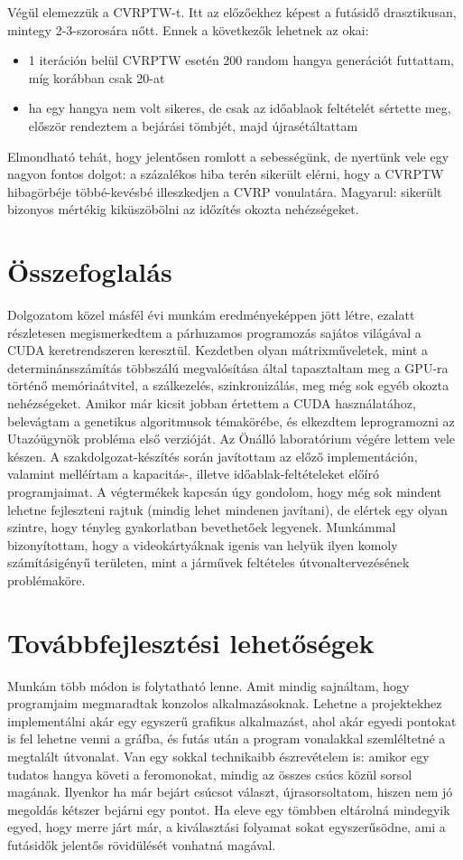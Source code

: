 Végül elemezzük a CVRPTW-t. Itt az előzőekhez képest a futásidő drasztikusan, mintegy 2-3-szorosára nőtt. Ennek a következők lehetnek az okai:
\begin{itemize}
	\item 1 iteráción belül CVRPTW esetén 200 random hangya generációt futtattam, míg korábban csak 20-at
	\item ha egy hangya nem volt sikeres, de csak az időablaok feltételét sértette meg, először rendeztem a bejárási tömbjét, majd újrasétáltattam
\end{itemize}
Elmondható tehát, hogy jelentősen romlott a sebességünk, de nyertünk vele egy nagyon fontos dolgot: a százalékos hiba terén sikerült elérni, hogy a CVRPTW hibagörbéje többé-kevésbé illeszkedjen a CVRP vonulatára. Magyarul: sikerült bizonyos mértékig kiküszöbölni az időzítés okozta nehézségeket.

\section{Összefoglalás}
Dolgozatom közel másfél évi munkám eredményeképpen jött létre, ezalatt részletesen megismerkedtem a párhuzamos programozás sajátos világával a CUDA keretrendszeren keresztül. Kezdetben olyan mátrixműveletek, mint a determinánsszámítás többszálú megvalósítása által tapasztaltam meg a GPU-ra történő memóriaátvitel, a szálkezelés, szinkronizálás, meg még sok egyéb okozta nehézségeket. Amikor már kicsit jobban értettem a CUDA használatához, belevágtam a genetikus algoritmusok témakörébe, és elkezdtem leprogramozni az Utazóügynök probléma első verzióját. Az Önálló laboratórium végére lettem vele készen. A szakdolgozat-készítés során javítottam az előző implementáción, valamint melléírtam a kapacitás-, illetve időablak-feltételeket előíró programjaimat. A végtermékek kapcsán úgy gondolom, hogy még sok mindent lehetne fejleszteni rajtuk (mindig lehet mindenen javítani), de elértek egy olyan szintre, hogy tényleg gyakorlatban bevethetőek legyenek. Munkámmal bizonyítottam, hogy a videokártyáknak igenis van helyük ilyen komoly számításigényű területen, mint a járművek feltételes útvonaltervezésének problémaköre.

\section{Továbbfejlesztési lehetőségek}

Munkám több módon is folytatható lenne. Amit mindig sajnáltam, hogy programjaim megmaradtak konzolos alkalmazásoknak. Lehetne a projektekhez implementálni akár egy egyszerű grafikus alkalmazást, ahol akár egyedi pontokat is fel lehetne venni a gráfba, és futás után a program vonalakkal szemléltetné a megtalált útvonalat. Van egy sokkal technikaibb észrevételem is: amikor egy tudatos hangya követi a feromonokat, mindig az összes csúcs közül sorsol magának. Ilyenkor ha már bejárt csúcsot választ, újrasorsoltatom, hiszen nem jó megoldás kétszer bejárni egy pontot. Ha eleve egy tömbben eltárolná mindegyik egyed, hogy merre járt már, a kiválasztási folyamat sokat egyszerűsödne, ami a futásidők jelentős rövidülését vonhatná magával.

